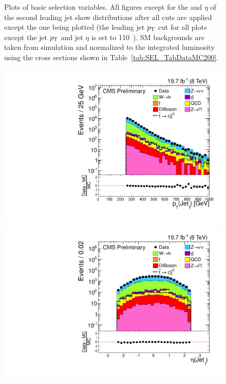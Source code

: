 \begin{figure}
\begin{center}
  \caption{Plots of basic selection variables.  All figures except for the \pt{} and $\eta$ of the second leading jet 
show distributions after all cuts are applied except the one being plotted (the leading jet $p_{\text{T}}$ cut for all plots except the jet $p_{\text{T}}$ and jet $\eta$ is set to 110~\GeV{}). \ac{SM} backgrounds are taken from simulation and normalized to the integrated luminosity using the cross sections shown in Table~\ref{tab:SEL_TabDataMC200}.
  \label{fig:n-1plots}}
  \end{center}
\end{figure}

\begin{figure}%
  \begin{center}
  \includegraphics[scale=0.32]     {Figures/sus13009/cut/Jet1Pt.pdf}
  \includegraphics[scale=0.32]     {Figures/sus13009/cut/Jet1Eta.pdf}

\end{center}
\end{figure}
